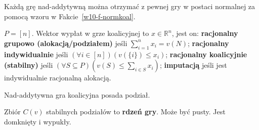 \begin{fakt}
    Każdą grę nad-addytywną można otrzymać z pewnej gry w postaci normalnej za pomocą wzoru w Fakcie~\ref{w10-f-normkoal}.
\end{fakt}
\begin{definicja}
    $P=[n]$. Wektor wypłat w grze koalicyjnej to $x\in\mathbb{R}^n$, jest on:
    \textbf{racjonalny grupowo (alokacją/podziałem)} jeśli $\sum_{i=1}^n{x_i=v(N)}$;
    \textbf{racjonalny indywidualnie} jeśli $(\forall i\in [n]) (v(\{i\}) \leq x_i)$;
    \textbf{racjonalny koalicyjnie (stabilny)} jeśli $(\forall S\subseteq P)(v(S)\leq\sum_{i\in S}{x_i})$;
    \textbf{imputacją} jeśli jest indywidualnie racjonalną alokacją.
\end{definicja}
\begin{fakt}
    Nad-addytywna gra koalicyjna posada podział.
\end{fakt}
\begin{definicja}
    Zbiór $C(v)$ stabilnych podziałów to \textbf{rdzeń gry}. Może być pusty. Jest domknięty i wypukły.
\end{definicja}


